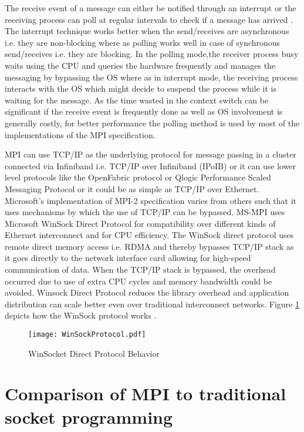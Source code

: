 The receive event of a message can either be notified through an interrupt or the receiving process can poll at regular intervals to check if a message has arrived \cite{mpirel}. The interrupt technique works better when the send/receives are asynchronous i.e. they are non-blocking where as polling works well in case of synchronous send/receives i.e. they are blocking. In the polling mode,the receiver process busy waits using the CPU and queries the hardware frequently and manages the messaging by bypassing the OS where as in interrupt mode, the receiving process interacts with the OS which might decide to suspend the process while it is waiting for the message. As the time wasted in the context switch can be significant if the receive event is frequently done as well as OS involvement is generally costly, for better performance the polling method is used by most of the implementations of the MPI specification. \newline

MPI can use TCP/IP as the underlying protocol for message passing in a cluster connected via Infiniband i.e. TCP/IP over Infiniband (IPoIB) or it can use lower level protocols like the OpenFabric protocol or Qlogic Performance Scaled Messaging Protocol or it could be as simple as TCP/IP over Ethernet. Microsoft's implementation of MPI-2 specification varies from others such that it uses mechanisms by which the use of TCP/IP can be bypassed. MS-MPI uses Microsoft WinSock Direct Protocol for compatibility over different kinds of Ethernet interconnect and for CPU efficiency. The WinSock direct protocol \cite{SDP} uses remote direct memory access i.e. RDMA and thereby bypasses TCP/IP stack as it goes directly to the network interface card allowing for high-speed communication of data. When the TCP/IP stack is bypassed, the overhead occurred due to use of extra CPU cycles and memory bandwidth could be avoided. Winsock Direct Protocol reduces the library overhead and application distribution can scale better even over traditional interconnect networks. Figure \ref{fig:WinsockProto} depicts how the WinSock protocol works \cite{msmpiWinSoc}. \newline

\begin{figure}[ht!]
\centering
\texttt{[image: WinSockProtocol.pdf]}
\caption{WinSocket Direct Protocol Behavior}
\label{fig:WinsockProto}
\end{figure}
   
\section{Comparison of MPI to traditional socket programming}

